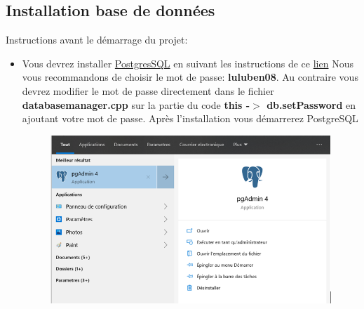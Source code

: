 \documentclass[10pt,a4paper,openany]{report}
\begin{document}
	\subsection{Installation base de données}
	Instructions avant le démarrage du projet:
	\begin{itemize}
		\item Vous devrez installer  \href{https://www.postgresql.org/download/}{PostgresSQL} en suivant les instructions de ce \href{https://www.veremes.com/installation-postgresql-windows}{lien}
		Nous vous recommandons de choisir le mot de passe: \textbf{luluben08}. Au contraire vous devrez modifier le mot de passe directement dans le fichier \textbf{databasemanager.cpp} sur la partie du code \textbf{this -$>$ db.setPassword} en ajoutant votre mot de passe. Après l'installation vous démarrerez PostgreSQL 
		\begin{figure}[H]
			\begin{center}
				\includegraphics[width = 1\textwidth]{Demarrer_Postgres.PNG}
			\end{center} 
		\end{figure}
	

\end{itemize}
\end{document}
